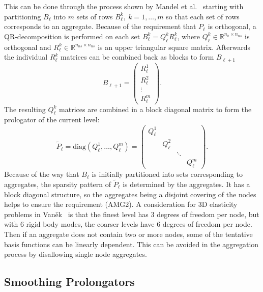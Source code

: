 This can be done through the process shown by Mandel et al.~\cite{Mandel1999} starting with partitioning $B_\ell$ into $m$ sets of rows $B_\ell^k,\ k = 1, \ldots, m$ so that each set of rows corresponds to an aggregate. Because of the requirement that $P_\ell$ is orthogonal, a QR-decomposition is performed on each set $B_\ell^{k} = Q_\ell^k R_\ell^k$, where $Q_\ell^k \in \mathbb{R}^{n_k \times n_{ns}}$ is orthogonal and $R_\ell^k \in \mathbb{R}^{n_{ns} \times n_{ns}}$ is an upper triangular square matrix. Afterwards the individual $R_\ell^k$ matrices can be combined back as blocks to form $B_{\ell+1}$
\begin{equation}
	B_{\ell+1} =
	\begin{pmatrix}
		R_\ell^1 \\
		R_\ell^2 \\
		\vdots \\
		R_\ell^m
	\end{pmatrix}.
\end{equation}
The resulting $Q_\ell^k$ matrices are combined in a block diagonal matrix to form the prologator of the current level:
\begin{equation}
	\tilde{P}_\ell = \text{diag}\left(Q_\ell^1, \ldots, Q_\ell^m\right) =
	\begin{pmatrix}
		Q_\ell^1 &          &        & \\
		         & Q_\ell^2 &        & \\
				 &          & \ddots & \\
				 &          &        & Q_\ell^m
	\end{pmatrix}.
\end{equation}
Because of the way that $B_\ell$ is initially partitioned into sets corresponding to aggregates, the sparsity pattern of $\tilde{P}_\ell$ is determined by the aggregates. It has a block diagonal structure, so the aggregates being a disjoint covering of the nodes helps to ensure the requirement (AMG2). A consideration for 3D elasticity problems in Van\v{e}k~\cite{Vanek1996} is that the finest level has 3 degrees of freedom per node, but with 6 rigid body modes, the coarser levels have 6 degrees of freedom per node. Then if an aggregate does not contain two or more nodes, some of the tentative basis functions can be linearly dependent. This can be avoided in the aggregation process by disallowing single node aggregates.

\subsection{Smoothing Prolongators}

